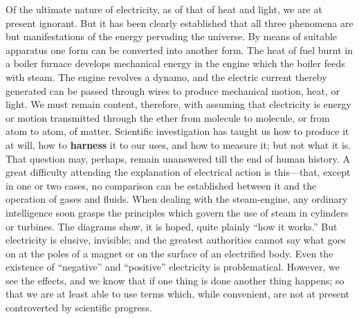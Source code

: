 \begin{linenumbers*}
\modulolinenumbers[5]
\indent Of the ultimate nature of electricity, as of that of heat and light, we are at present ignorant. But it has been clearly established that all three phenomena are but manifestations of the energy pervading the universe. By means of suitable apparatus one form can be converted into another form. The heat of fuel burnt in a boiler furnace develops mechanical energy in the engine which the boiler feeds with steam. The engine revolves a dynamo, and the electric current thereby generated can be passed through wires to produce mechanical motion, heat, or light. We must remain content, therefore, with assuming that electricity is energy or motion transmitted through the ether from molecule to molecule, or from atom to atom, of matter. Scientific investigation has taught us how to produce it at will, how to \textbf{harness} it to our uses, and how to measure it; but not what it is. That question may, perhaps, remain unanswered till the end of human history. A great difficulty attending the explanation of electrical action is this—that, except in one or two cases, no comparison can be established between it and the operation of gases and fluids. When dealing with the steam-engine, any ordinary intelligence soon grasps the principles which govern the use of steam in cylinders or turbines. The diagrams show, it is hoped, quite plainly ``how it works.'' But electricity is elusive, invisible; and the greatest authorities cannot say what goes on at the poles of a magnet or on the surface of an electrified body. Even the existence of ``negative'' and ``positive'' electricity is problematical. However, we see the effects, and we know that if one thing is done another thing happens; so that we are at least able to use terms which, while convenient, are not at present controverted by scientific progress.


\end{linenumbers*}
